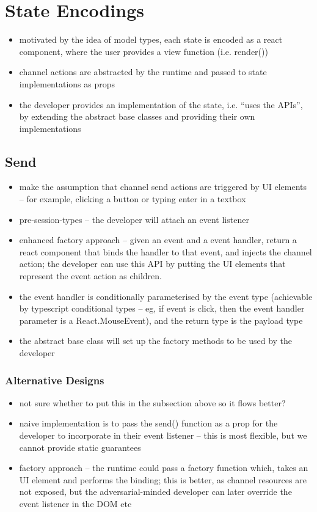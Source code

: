 \section{State Encodings}

\begin{itemize}
\item motivated by the idea of model types, each state is encoded as a react component, where the user provides a view function (i.e. render())
\item channel actions are abstracted by the runtime and passed to state implementations as props
\item the developer provides an implementation of the state, i.e. ``uses the APIs'', by extending the abstract base classes and providing their own implementations
\end{itemize}

\subsection{Send}
\begin{itemize}
\item make the assumption that channel send actions are triggered by UI elements -- for example, clicking a button or typing enter in a textbox
\item pre-session-types -- the developer will attach an event listener
\item enhanced factory approach -- given an event and a event handler, return a react component that binds the handler to that event, and injects the channel action; the developer can use this API by putting the UI elements that represent the event action as children.
\item the event handler is conditionally parameterised by the event type (achievable by typescript conditional types -- eg, if event is click, then the event handler parameter is a React.MouseEvent), and the return type is the payload type
\item the abstract base class will set up the factory methods to be used by the developer
\end{itemize}

\subsubsection{Alternative Designs}
\begin{itemize}
\item not sure whether to put this in the subsection above so it flows better?
\item naive implementation is to pass the send() function as a prop for the developer to incorporate in their event listener -- this is most flexible, but we cannot provide static guarantees
\item factory approach -- the runtime could pass a factory function which, takes an UI element and performs the binding; this is better, as channel resources are not exposed, but the adversarial-minded developer can later override the event listener in the DOM etc
\end{itemize}

